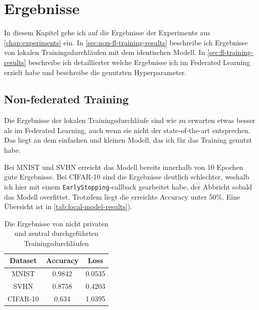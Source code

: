 \chapter{Ergebnisse}\label{chap:results}

In diesem Kapitel gehe ich auf die Ergebnisse der Experimente aus \autoref{chap:experiments} ein. In \autoref{sec:non-fl-training-results} beschreibe ich Ergebnisse von lokalen Trainingsdurchläufen mit dem identischen Modell. In \autoref{sec:fl-training-results} beschreibe ich detaillierter welche Ergebnisse ich im Federated Learning erzielt habe und beschreibe die genutzten Hyperparameter.

\section{Non-federated Training} \label{sec:non-fl-training-results}
Die Ergebnisse der lokalen Trainingsdurchläufe sind wie zu erwarten etwas besser als im Federated Learning, auch wenn sie nicht der state-of-the-art entsprechen. Das liegt an dem einfachen und kleinen Modell, das ich für das Training genutzt habe.

Bei MNIST und SVHN erreicht das Modell bereits innerhalb von 10 Epochen gute Ergebnisse. Bei CIFAR-10 sind die Ergebnisse deutlich schlechter, weshalb ich hier mit einem \texttt{EarlyStopping}-callback gearbeitet habe, der Abbricht sobald das Modell overfittet. Trotzdem liegt die erreichte Accuracy unter 50\%. Eine Übersicht ist in \autoref{tab:local-model-results}).

\begin{table}
	\centering
	\begin{tabular}{ccc}
		\toprule
		Dataset & Accuracy & Loss \\
		\midrule
		MNIST & 0.9842 & 0.0535 \\
		SVHN & 0.8758 & 0.4203 \\
		CIFAR-10 & 0.634 & 1.0395 \\
		\bottomrule
	\end{tabular}
	\caption{Die Ergebnisse von nicht privaten und zentral durchgeführten Trainingsdurchläufen}
	\label{tab:local-model-results}
\end{table}

